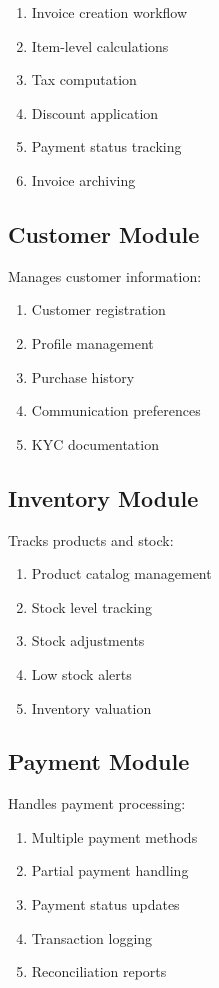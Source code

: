 \documentclass[12pt,a4paper]{report}
\begin{document}
\begin{enumerate}[label=\roman*)]
    \item Invoice creation workflow
    \item Item-level calculations
    \item Tax computation
    \item Discount application
    \item Payment status tracking
    \item Invoice archiving
\end{enumerate}

\subsection{Customer Module}

Manages customer information:

\begin{enumerate}[label=\roman*)]
    \item Customer registration
    \item Profile management
    \item Purchase history
    \item Communication preferences
    \item KYC documentation
\end{enumerate}

\subsection{Inventory Module}

Tracks products and stock:

\begin{enumerate}[label=\roman*)]
    \item Product catalog management
    \item Stock level tracking
    \item Stock adjustments
    \item Low stock alerts
    \item Inventory valuation
\end{enumerate}

\subsection{Payment Module}

Handles payment processing:

\begin{enumerate}[label=\roman*)]
    \item Multiple payment methods
    \item Partial payment handling
    \item Payment status updates
    \item Transaction logging
    \item Reconciliation reports
\end{enumerate}
\end{document}
